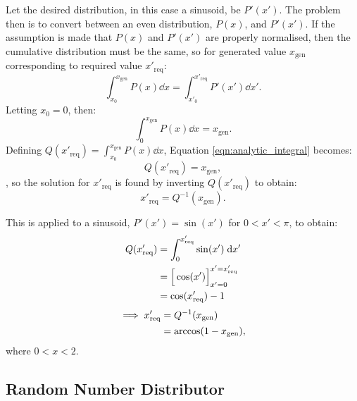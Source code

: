 Let the desired distribution, in this case a sinusoid, be $P'(x')$. The problem then is to convert between an even distribution, $P(x)$, and $P'(x')$. If the assumption is made that $P(x)$ and $P'(x')$ are properly normalised, then the cumulative distribution must be the same, so for generated value $x_{\text{gen}}$ corresponding to required value $x'_{\text{req}}$:
\begin{equation}
    \int_{x_0}^{x_{\text{gen}}} P(x) \dd x = \int_{x'_0}^{x'_{\text{req}}} P'(x') \dd x'.
    \label{eqn:analytic_integral}
\end{equation}
Letting $x_0 = 0$, then:
\begin{equation}
    \int_0^{x_{\text{gen}}} P(x) \dd x = x_{\text{gen}}.
\end{equation}
Defining $Q(x'_{\text{req}}) = \int_{x_0}^{x_{\text{gen}}} P(x) \dd x$, Equation \ref{eqn:analytic_integral} becomes:
\begin{equation}
    Q(x'_{\text{req}}) = x_{\text{gen}},
    \label{eqn:analytic_q}
\end{equation}, so the solution for $x'_{\text{req}}$ is found by inverting $Q(x'_{\text{req}})$ to obtain:
\begin{equation}
    x'_{\text{req}} = Q^{-1}(x_{\text{gen}}).
\end{equation}

This is applied to a sinusoid, $P'(x') = \sin(x')$ for $0 < x' < \pi$, to obtain:
\begin{align}
    Q(x'_{\text{req}}) &= \int_0^{x'_{\text{req}}} \sin(x') \; \mathrm{d} x' \notag \\
                       &= \Big[\cos(x')\Big]_{x' = 0}^{x' = x'_{\text{req}}} \\
                       &= \cos(x'_{\text{req}}) - 1 \notag
\end{align}
\begin{align}
    \implies x'_{\text{req}} &= Q^{-1}(x_{\text{gen}}) \notag \\
                             &= \arccos(1 - x_{\text{gen}}),
\end{align} where $0 < x < 2$.

\subsection{Random Number Distributor}
\label{subsec:random_number_distributor}
